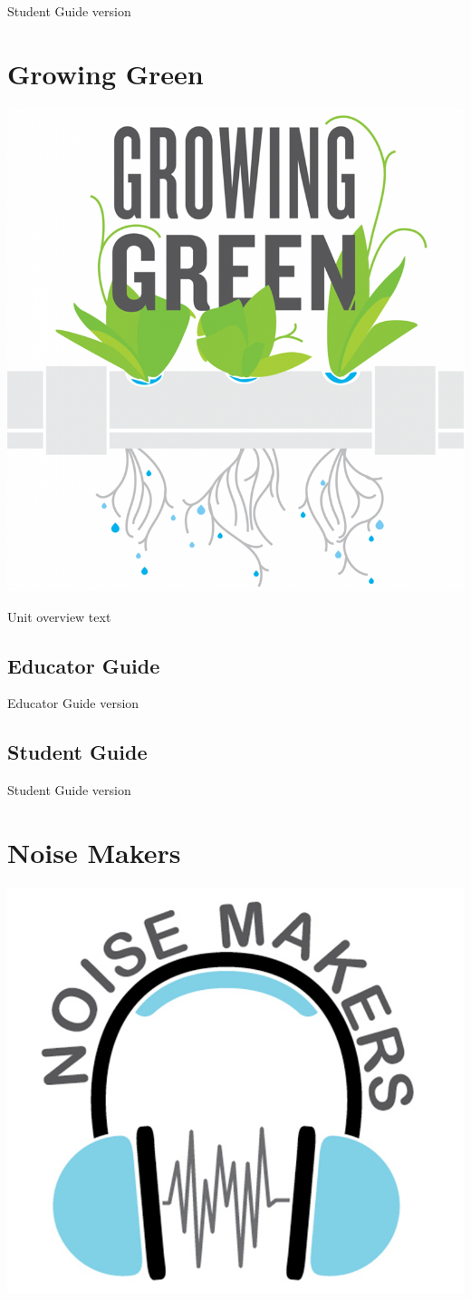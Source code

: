\documentclass[]{book}
\begin{document}
Student Guide version

\chapter{Growing Green}\label{growing-green}

\begin{center}\includegraphics[width=0.5\linewidth]{img/growingGreen} \end{center}

Unit overview text

\section{Educator Guide}\label{educator-guide-2}

Educator Guide version

\section{Student Guide}\label{student-guide-2}

Student Guide version

\chapter{Noise Makers}\label{noise-makers}

\begin{center}\includegraphics[width=0.5\linewidth]{img/noiseMakers} \end{center}
\end{document}
